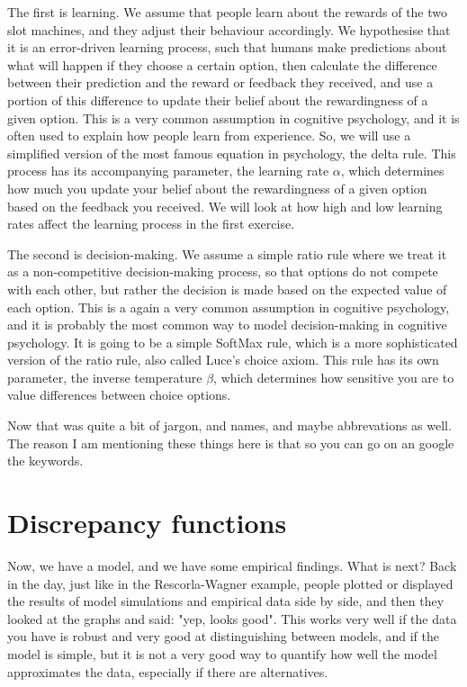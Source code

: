 \documentclass[12pt]{article}
\begin{document}
The first is learning. We assume that people learn about the rewards of the two slot machines, and they adjust their behaviour accordingly. We hypothesise that it is an error-driven learning process, such that humans make predictions about what will happen if they choose a certain option, then calculate the difference between their prediction and the reward or feedback they received, and use a portion of this difference to update their belief about the rewardingness of a given option. This is a very common assumption in cognitive psychology, and it is often used to explain how people learn from experience. So, we will use a simplified version of the most famous equation in psychology, the delta rule. This process has its accompanying parameter, the learning rate $\alpha$, which determines how much you update your belief about the rewardingness of a given option based on the feedback you received. We will look at how high and low learning rates affect the learning process in the first exercise.

The second is decision-making. We assume a simple ratio rule where we treat it as a non-competitive decision-making process, so that options do not compete with each other, but rather the decision is made based on the expected value of each option. This is a again a very common assumption in cognitive psychology, and it is probably the most common way to model decision-making in cognitive psychology. It is going to be a simple SoftMax rule, which is a more sophisticated version of the ratio rule, also called Luce's choice axiom. This rule has its own parameter, the inverse temperature $\beta$, which determines how sensitive you are to value differences between choice options.

Now that was quite a bit of jargon, and names, and maybe abbrevations as well. The reason I am mentioning these things here is that so you can go on an google the keywords.

\section{Discrepancy functions}

Now, we have a model, and we have some empirical findings. What is next? Back in the day, just like in the Rescorla-Wagner example, people plotted or displayed the results of model simulations and empirical data side by side, and then they looked at the graphs and said: "yep, looks good". This works very well if the data you have is robust and very good at distinguishing between models, and if the model is simple, but it is not a very good way to quantify how well the model approximates the data, especially if there are alternatives.
\end{document}
